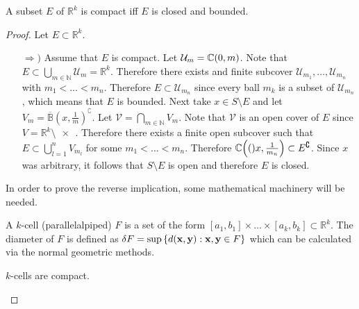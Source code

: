 \documentclass[../notes.tex]{subfiles}
\begin{document}
\begin{theorem}
    \label{thm:heineborel}
    A subset $E$ of $\mathbb{R}^k$ is compact iff $E$ is closed and bounded.
\end{theorem}
\begin{proof}
    Let $E \subset \mathbb{R}^k$.
    \begin{enumerate}
        \item[$\Rightarrow)$]
        Assume that $E$ is compact. Let $\mathcal{U}_m = \mathbb{C}\qty(0,m)$. Note that $E \subset \bigcup_{m \in \mathbb{N}} \mathcal{U}_m = \mathbb{R}^k$. Therefore there exists and finite subcover $\mathcal{U}_{m_1}, \ldots, \mathcal{U}_{m_n}$ with $m_1 < \ldots < m_n$. Therefore $E \subset \mathcal{U}_{m_n}$ since every ball $m_k$ is a subset of $\mathcal{U}_{m_n}$, which means that $E$ is bounded. Next take $x \in S\setminus E$ and let $V_m = \overline{\mathbb{B}}(x,\frac{1}{m})^\complement$. Let $\mathcal{V} = \bigcap_{m\in \mathbb{N}} V_m$. Note that $\mathcal{V}$ is an open cover of $E$ since $V = \mathbb{R}^k \setminus \qty{x}$. Therefore there exists a finite open subcover such that $E \subset \bigcup_{l = 1}^n V_{m_l}$ for some $m_1 < \ldots < m_n$. Therefore $\mathbb{C}\qty(()x, \frac{1}{m_n}) \subset E^\complement$. Since $x$ was arbitrary, it follows that $S \setminus E$ is open and therefore $E$ is closed.
    \end{enumerate}

    In order to prove the reverse implication, some mathematical machinery will be needed.

    \begin{definition}[K-Cell]
        A $k$-cell (parallelalpiped) $F$ is a set of the form $[a_1, b_1] \times \ldots \times [a_k, b_k] \subset \mathbb{R}^k$. The diameter of $F$ is defined as $\delta F = \sup\qty{d(\vb{x}, \vb{y}) : \vb{x}, \vb{y} \in F}$ which can be calculated via the normal geometric methods.
    \end{definition}

    \begin{lemma}
        \label{lem:kcellsarecompact}
        $k$-cells are compact.
    \end{lemma}


\end{proof}
\end{document}

